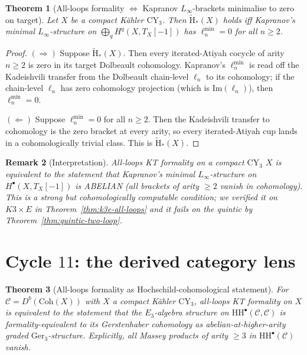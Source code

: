 \documentclass[11pt]{article}
\newtheorem{theorem}{Theorem}[section]
\newtheorem{remark}[theorem]{Remark}
\providecommand{\CY}{\mathrm{CY}}
\providecommand{\HH}{\mathrm{HH}}
\providecommand{\Coh}{\mathrm{Coh}}
\providecommand{\cC}{\mathcal{C}}
\providecommand{\Ger}{\mathrm{Ger}}
\begin{document}
\begin{theorem}[All-loops formality $\Leftrightarrow$ Kapranov
$L_\infty$-brackets minimalise to zero on target]
\label{thm:kapranov-minimal-zero}
\ClaimStatusTheorem
Let $X$ be a compact K\"ahler $\CY_3$.  Then
$\widetilde{\mathrm{H}}_*(X)$ holds iff Kapranov's minimal
$L_\infty$-structure on $\bigoplus_q H^q(X, T_X[-1])$ has
$\ell_n^{\min} = 0$ for all $n \geq 2$.
\end{theorem}

\begin{proof}
$(\Rightarrow)$  Suppose $\widetilde{\mathrm{H}}_*(X)$.  Then every
iterated-Atiyah cocycle of arity $n \geq 2$ is zero in its target
Dolbeault cohomology.  Kapranov's $\ell_n^{\min}$ is read off the
Kadeishvili transfer from the Dolbeault chain-level $\ell_n$ to
its cohomology; if the chain-level $\ell_n$ has zero cohomology
projection (which is $\mathrm{Im}(\ell_n)$), then $\ell_n^{\min} = 0$.

$(\Leftarrow)$  Suppose $\ell_n^{\min} = 0$ for all $n \geq 2$.
Then the Kadeishvili transfer to cohomology is the zero bracket at
every arity, so every iterated-Atiyah cup lands in a cohomologically
trivial class.  This is $\widetilde{\mathrm{H}}_*(X)$.
\end{proof}

\begin{remark}[Interpretation]
\label{rem:minimal-zero-interpretation}
All-loops KT formality on a compact $\CY_3$ $X$ is equivalent to
the statement that Kapranov's minimal $L_\infty$-structure on
$H^\bullet(X, T_X[-1])$ is ABELIAN (all brackets of arity $\geq 2$
vanish in cohomology).  This is a strong but cohomologically
computable condition; we verified it on $K3 \times E$ in
Theorem~\ref{thm:k3e-all-loops} and it fails on the quintic by
Theorem~\ref{thm:quintic-two-loop}.
\end{remark}

\section{Cycle $11$:  the derived category lens}
\label{sec:cycle-11-derived-category}

\begin{theorem}[All-loops formality as Hochschild-cohomological
statement]
\label{thm:hh-formality}
\ClaimStatusTheorem
For $\cC = D^b(\Coh(X))$ with $X$ a compact K\"ahler $\CY_3$,
all-loops KT formality on $X$ is equivalent to the statement that
the $E_3$-algebra structure on $\HH^\bullet(\cC, \cC)$ is
formality-equivalent to its Gerstenhaber cohomology as
abelian-at-higher-arity graded $\Ger_3$-structure.  Explicitly,
all Massey products of arity $\geq 3$ in $\HH^\bullet(\cC)$
vanish.
\end{theorem}
\end{document}
